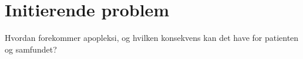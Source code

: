 \section{Initierende problem}
Hvordan forekommer apopleksi, og hvilken konsekvens kan det have for patienten og samfundet?
